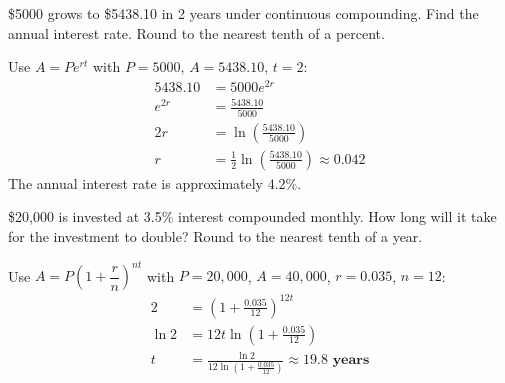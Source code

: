 \documentclass{ximera}
\begin{document}
\begin{problem}
\$5000 grows to \$5438.10 in 2 years under continuous compounding. Find the annual interest rate. Round to the nearest tenth of a percent.

\begin{solution}
Use $A = Pe^{rt}$ with $P=5000$, $A=5438.10$, $t=2$:
\begin{align*}
  5438.10 &= 5000e^{2r}\\
  e^{2r} &= \frac{5438.10}{5000}\\
  2r &= \ln\!\left(\frac{5438.10}{5000}\right)\\
  r &= \frac{1}{2}\ln\!\left(\frac{5438.10}{5000}\right) \approx 0.042
\end{align*}
The annual interest rate is approximately $\mathbf{4.2\%}$.
\end{solution}
\end{problem}


\begin{problem}
\$20,000 is invested at 3.5\% interest compounded monthly. How long will it take for the investment to double? Round to the nearest tenth of a year.

\begin{solution}
Use $A = P\!\left(1+\dfrac{r}{n}\right)^{nt}$ with $P=20{,}000$, $A=40{,}000$, $r=0.035$, $n=12$:
\begin{align*}
  2 &= \left(1+\frac{0.035}{12}\right)^{12t}\\
  \ln 2 &= 12t\ln\!\left(1+\frac{0.035}{12}\right)\\
  t &= \frac{\ln 2}{12\ln\!\left(1+\frac{0.035}{12}\right)} \approx \mathbf{19.8 \text{ years}}
\end{align*}
\end{solution}
\end{problem}
\end{document}
